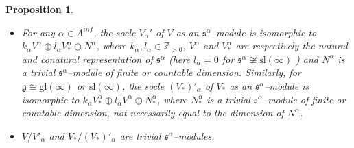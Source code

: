 \documentclass[oneside,leqno,12pt]{article}
\newcounter{theorem}
\newtheorem{prop}[theo]{Proposition}
\def\gg{\mathfrak{g}}
\newcommand {\NN} {\mathbb{Z}_{>0}}
\renewcommand{\ss}{\mathfrak{s}}
\renewcommand{\gg}{\mathfrak{g}}
\newcommand{\gl}{\mathrm{gl}}
\renewcommand{\sl}{\mathrm{sl}}
\begin{document}
\begin{prop}\label{prop2.5}~
\begin{itemize}
\item[\rm{(i)}] For any $\alpha\in A^{inf}$, the socle $V_\alpha'$ of $V$ as an $\ss^\alpha$--module is isomorphic to $k_\alpha V^\alpha\oplus l_\alpha V_*^\alpha\oplus N^\alpha$, where $k_\alpha,l_\alpha\in \NN$, $V^\alpha$ and $V_*^\alpha$ are respectively the natural and conatural representation of $\ss^\alpha$ (here $l_\alpha=0$ for $\ss^\alpha\not \cong \sl(\infty)$ ) and $N^\alpha$ is a trivial $\ss^\alpha$--module of finite or countable dimension. Similarly, for $\gg\cong \gl(\infty)$ or $\sl(\infty)$, the socle $(V_*)'_\alpha$ of $V_*$ as an $\ss^\alpha$--module is isomorphic to $k_\alpha V_*^\alpha\oplus l_\alpha V^\alpha\oplus N^\alpha_*$, where $N_*^\alpha$ is a trivial $\ss^\alpha$--module of finite or countable dimension, not necessarily equal to the dimension of $N^\alpha$. 
\item[\rm{(ii)}] $V/V'_\alpha$ and $V_*/(V_*)'_\alpha$ are trivial $\ss^\alpha$--modules.
\end{itemize}
\end{prop}
\end{document}
